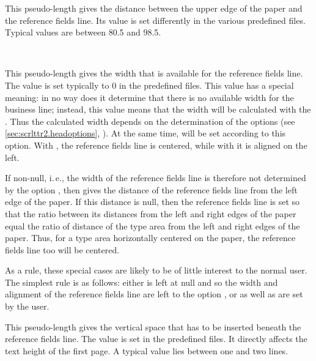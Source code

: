 \begin{Declaration}
\end{Declaration}
%
This pseudo-length gives the distance between the upper edge of the
paper and the reference fields line. Its value is set differently in
the various predefined  files. Typical values are between
80.5 and 98.5.
%
%


\begin{Declaration}
  \\
\end{Declaration}
%
This pseudo-length gives the width that is available for the reference
fields line.  The value is set typically to 0 in the
predefined  files.  This value has a special meaning: in no
way does it determine that there is no available width for the
business line; instead, this value means that the width will be
calculated with the . Thus the calculated width depends
on the determination of the options  (see
\autoref{sec:scrlttr2.headoptions},
). At the same time,
 will be set according to this option. With
, the reference fields line is centered,
while with  it is aligned on the left.

If  non-null, i.\,e., the width of the reference
fields line is therefore not determined by the option
, then  gives the distance of the
reference fields line from the left edge of the paper. If this
distance is null, then the reference fields line is set so that the
ratio between its distances from the left and right edges of the paper
equal the ratio of distance of the type area from the left and right
edges of the paper. Thus, for a type area horizontally centered on the
paper, the reference fields line too will be centered.

As a rule, these special cases are likely to be of little interest to
the normal user. The simplest rule is as follows: either
 is left at null and so the width and alignment of
the reference fields line are left to the option , or
 as well as  are set by the user.
%
%
%


\begin{Declaration}
\end{Declaration}
%
This pseudo-length gives the vertical space that has to be inserted
beneath the reference fields line. The value is set in the predefined
 files. It directly affects the text height of the first
page. A typical value lies between one and two lines.
%
%

